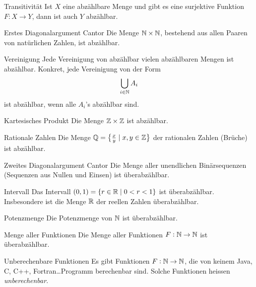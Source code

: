\begin{lemma}{Transitivität}
    Ist $X$ eine abzählbare Menge und gibt es eine surjektive Funktion $F:X\to Y$, dann ist auch $Y$ abzählbar.
\end{lemma}

\begin{lemma}{Erstes Diagonalargument Cantor}
    Die Menge $\mathbb{N}\times\mathbb{N}$, bestehend aus allen Paaren von natürlichen Zahlen, ist abzählbar.
\end{lemma}

\begin{lemma}{Vereinigung}
    Jede Vereinigung von abzählbar vielen abzählbaren Mengen ist abzählbar. Konkret, jede Vereinigung von der Form
    \[
        \bigcup_{i\in\mathbb{N}}A_i
    \]
    ist abzählbar, wenn alle $A_i$'s abzählbar sind.
\end{lemma}

\begin{corollary}{Kartesisches Produkt}
    Die Menge $\mathbb{Z}\times \mathbb{Z}$ ist abzählbar.
\end{corollary}

\begin{corollary}{Rationale Zahlen}
    Die Menge $\mathbb{Q}=\big\{\frac{x}{y}\mid x,y\in \mathbb{Z}\big\}$ der rationalen Zahlen (Brüche) ist abzählbar.
\end{corollary}

\begin{theorem}{Zweites Diagonalargument Cantor}
    Die Menge aller unendlichen Binärsequenzen (Sequenzen aus Nullen und Einsen) ist überabzählbar.
\end{theorem}

\begin{corollary}{Intervall}
    Das Intervall $(0,1)=\{r\in\mathbb{R}\mid 0<r<1 \}$ ist überabzählbar. Insbesondere ist die Menge $\mathbb{R}$ der reellen Zahlen überabzählbar.
\end{corollary}

\begin{corollary}{Potenzmenge}
    Die Potenzmenge von $\mathbb{N}$ ist überabzählbar.
\end{corollary}

\begin{corollary}{Menge aller Funktionen}
    Die Menge aller Funktionen $F:\mathbb{N}\to\mathbb{N}$ ist überabzählbar.
\end{corollary}

\begin{corollary}{Unberechenbare Funktionen}
    Es gibt Funktionen $F:\mathbb{N}\to\mathbb{N}$, die von keinem Java, C, C++, Fortran\dots Programm berechenbar sind. Solche Funktionen heissen \textit{unberechenbar}.
\end{corollary}

